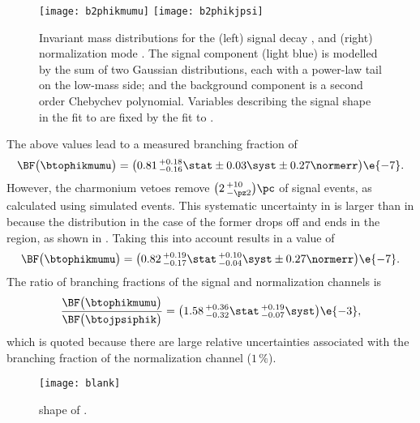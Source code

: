 \begin{figure}
  \begin{center}
    \texttt{[image: b2phikmumu]}
    \texttt{[image: b2phikjpsi]}
    \caption[Fits to \btokphimumu and \btojpsiphik]
    {
      Invariant mass distributions for the
      (left) signal decay \btophikmumu, and
      (right) normalization mode \btojpsiphik.
      The signal component (light blue) is modelled by the sum of two Gaussian distributions, each
      with a power-law tail on the low-mass side; and the background component is a second order
      Chebychev polynomial.
      Variables describing the signal shape in the fit to \btophikmumu are fixed by the fit to
      \btojpsiphik.
    }
    \label{fig:phik:fit}
  \end{center}
\end{figure}

The above values lead to a measured branching fraction of
\begin{equation}
  \BF\big(\btophikmumu\big)=
  \big(0.81\,^{+0.18}_{-0.16}\stat\pm0.03\syst\pm0.27\normerr\big)\e{-7}.
\end{equation}
However, the charmonium vetoes remove $\big(2\,^{+10}_{-\pz2}\big)\pc$ of signal events, as
calculated using simulated events.
This systematic uncertainty in \btophikmumu is larger than in \btokpipimumu because the \qsq
distribution in the case of the former drops off and ends in the \jpsi region, as shown in
.
Taking this into account results in a value of
\begin{equation}
  \BF\big(\btophikmumu\big)=
  \big(0.82\,^{+0.19}_{-0.17}\stat\,^{+0.10}_{-0.04}\syst\pm0.27\normerr\big)\e{-7}.
\end{equation}
The ratio of branching fractions of the signal and normalization channels is
\begin{equation}
  \frac{ \BF\big(\btophikmumu\big) }{ \BF\big(\btojpsiphik\big) }
  =\big(1.58\,^{+0.36}_{-0.32}\stat\,^{+0.19}_{-0.07}\syst\big)\e{-3},
\end{equation}
which is quoted because there are large relative uncertainties associated with the branching
fraction of the normalization channel (\approx$1\,\%$).

\begin{figure}
  \begin{center}
    \texttt{[image: blank]}
    \caption[CHIPS]
    {
      \qsq shape of \phik.
    }
    \label{}
  \end{center}
\end{figure}


